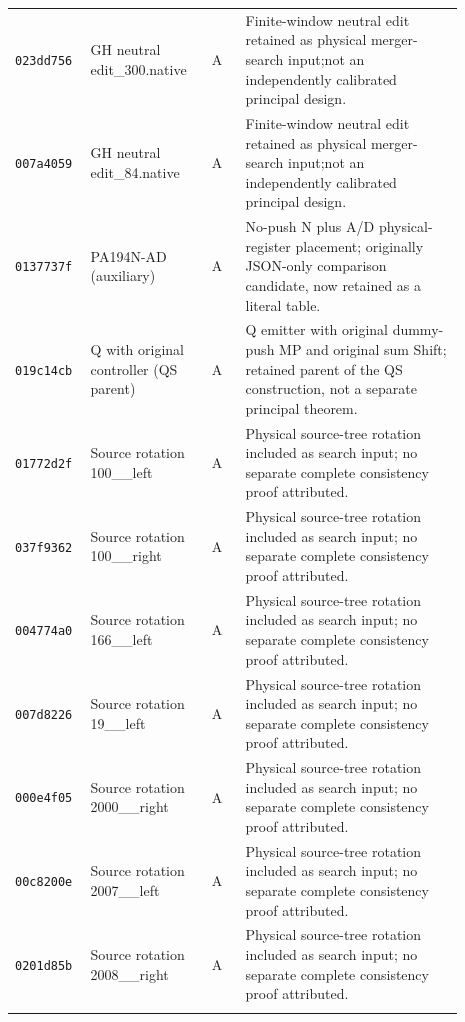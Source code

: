 \begin{longtable}{p{0.12\linewidth}p{0.25\linewidth}p{0.07\linewidth}p{0.45\linewidth}}
\texttt{023dd756} & GH neutral edit\_\allowbreak 300.native & A & Finite-window neutral edit retained as physical merger-search input;not an independently calibrated principal design. \\ \addlinespace[2pt]
\texttt{007a4059} & GH neutral edit\_\allowbreak 84.native & A & Finite-window neutral edit retained as physical merger-search input;not an independently calibrated principal design. \\ \addlinespace[2pt]
\texttt{0137737f} & PA194N-AD (auxiliary) & A & No-push N plus A/D physical-register placement; originally JSON-only comparison candidate, now retained as a literal table. \\ \addlinespace[2pt]
\texttt{019c14cb} & Q with original controller (QS parent) & A & Q emitter with original dummy-push MP and original sum Shift; retained parent of the QS construction, not a separate principal theorem. \\ \addlinespace[2pt]
\texttt{01772d2f} & Source rotation 100\_\allowbreak 164\_\allowbreak left & A & Physical source-tree rotation included as search input; no separate complete consistency proof attributed. \\ \addlinespace[2pt]
\texttt{037f9362} & Source rotation 100\_\allowbreak 174\_\allowbreak right & A & Physical source-tree rotation included as search input; no separate complete consistency proof attributed. \\ \addlinespace[2pt]
\texttt{004774a0} & Source rotation 166\_\allowbreak 179\_\allowbreak left & A & Physical source-tree rotation included as search input; no separate complete consistency proof attributed. \\ \addlinespace[2pt]
\texttt{007d8226} & Source rotation 19\_\allowbreak 29\_\allowbreak left & A & Physical source-tree rotation included as search input; no separate complete consistency proof attributed. \\ \addlinespace[2pt]
\texttt{000e4f05} & Source rotation 2000\_\allowbreak 2001\_\allowbreak right & A & Physical source-tree rotation included as search input; no separate complete consistency proof attributed. \\ \addlinespace[2pt]
\texttt{00c8200e} & Source rotation 2007\_\allowbreak 2008\_\allowbreak left & A & Physical source-tree rotation included as search input; no separate complete consistency proof attributed. \\ \addlinespace[2pt]
\texttt{0201d85b} & Source rotation 2008\_\allowbreak 2009\_\allowbreak right & A & Physical source-tree rotation included as search input; no separate complete consistency proof attributed. \\ \addlinespace[2pt]

\end{longtable}
